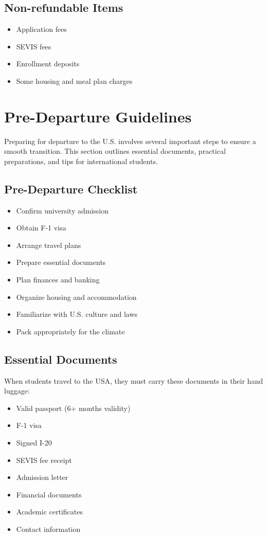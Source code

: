 \subsection{Non-refundable Items}
\begin{itemize}
    \item Application fees
    \item SEVIS fees
    \item Enrollment deposits
    \item Some housing and meal plan charges
\end{itemize}

\section{Pre-Departure Guidelines}
Preparing for departure to the U.S. involves several important steps to ensure a smooth transition. This section outlines essential documents, practical preparations, and tips for international students.
\subsection{Pre-Departure Checklist}
\begin{itemize}
    \item Confirm university admission
    \item Obtain F-1 visa
    \item Arrange travel plans
    \item Prepare essential documents
    \item Plan finances and banking
    \item Organize housing and accommodation
    \item Familiarize with U.S. culture and laws
    \item Pack appropriately for the climate
\end{itemize}

\subsection{Essential Documents}
When students travel to the USA, they must carry these documents in their hand luggage:
\begin{itemize}
    \item Valid passport (6+ months validity)
    \item F-1 visa
    \item Signed I-20
    \item SEVIS fee receipt
    \item Admission letter
    \item Financial documents
    \item Academic certificates
    \item Contact information
\end{itemize}

